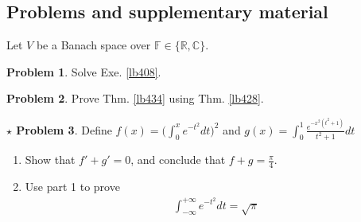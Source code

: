 \documentclass[12pt,b5paper,notitlepage]{article}
\theoremstyle{definition}
\newtheorem{rem}[df]{Remark}
\newtheorem{prob}{\color{red}Problem}[section]
\newtheorem{sprob}[prob]{\color{red}$\star$ Problem}
\theoremstyle{plain}
\newcommand{\scr}{\mathscr}
\newcommand{\im}{\mathbf{i}}
\newcommand{\Cbb}{\mathbb C}
\newcommand{\Rbb}{\mathbb R}
\newcommand{\Fbb}{\mathbb F}
\newcommand{\dps}{\displaystyle}
\numberwithin{equation}{section}
\begin{document}
\begin{comment}
\begin{rem}
The proof of Prop. \ref{lb445} also shows that $f\in\scr R^1(\Rbb,\Cbb)$ can be approximated by linear combinations of functions of the form $\chi_J$ (where $J$ is an interval) under the $L^1$-norm. Thus, the Riemann-Lebesgue lemma can also be proved by showing that $\lim_{t\rightarrow\pm\infty}\int_\Rbb \chi_J(x)e^{\im tx}dx=0$. For such a proof one does not need SW theorem. However, in the general measure theory, it is often more convenient to approximate an integrable function by continuous compactly supported ones. For example, if a function is defined on a manifold (e.g., a sphere, or a more complicated geometric object), it is not easy to approximate such a function by a linear combination of $\chi_E$ where $E$ is a set as simple as an interval. 
\end{rem}
\end{comment}















\subsection{Problems and supplementary material}



Let $V$ be a Banach space over $\Fbb\in\{\Rbb,\Cbb\}$.

\begin{prob}
Solve Exe. \ref{lb408}.
\end{prob}

\begin{prob}\label{lb430}
Prove Thm. \ref{lb434} using Thm. \ref{lb428}.
\end{prob}


\begin{sprob}\label{lb435}
Define $\dps f(x)=\Big(\int_0^x e^{-t^2}dt\Big)^2$ and $\dps g(x)=\int_0^1\frac{e^{-x^2(t^2+1)}}{t^2+1}dt$
\begin{enumerate}
\item Show that $f'+g'=0$, and conclude that $f+g=\frac\pi 4$.
\item Use part 1 to prove
\begin{align}
\int_{-\infty}^{+\infty}e^{-t^2}dt=\sqrt\pi 
\end{align}
\end{enumerate}
\end{sprob}
\end{document}
